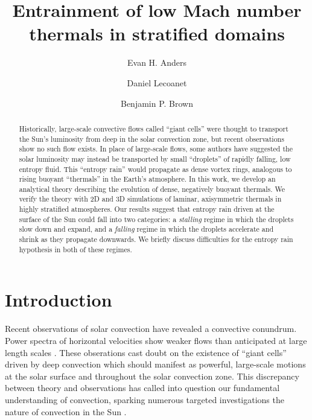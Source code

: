 \documentclass[twocolumn, amsmath, amsfonts, amssymb, trackchanges]{aastex62}
\begin{document}
\title{Entrainment of low Mach number thermals in stratified domains}


\author[0000-0002-3433-4733]{Evan H. Anders}
\author[0000-0002-7635-9728]{Daniel Lecoanet}
\author[0000-0001-8935-219X]{Benjamin P. Brown}


\begin{abstract}
Historically, large-scale convective flows called ``giant cells'' were thought to transport the Sun's luminosity from deep in the solar convection zone, but recent observations show no such flow exists.
In place of large-scale flows, some authors have suggested the solar luminosity may instead be transported by small ``droplets'' of rapidly falling, low entropy fluid.
This ``entropy rain'' would propagate as dense vortex rings, analogous to rising buoyant ``thermals'' in the Earth's atmosphere.
In this work, we develop an analytical theory describing the evolution of dense, negatively buoyant thermals.
We verify the theory with 2D and 3D simulations of laminar, axisymmetric thermals in highly stratified atmospheres.
Our results suggest that entropy rain driven at the surface of the Sun could fall into two categories: a \emph{stalling} regime in which the droplets slow down and expand, and a \emph{falling} regime in which the droplets accelerate and shrink as they propagate downwards.
We briefly discuss difficulties for the entropy rain hypothesis in both of these regimes.
\end{abstract}


\section{Introduction}
\label{sec:intro}
Recent observations of solar convection have revealed a convective conundrum.
Power spectra of horizontal velocities show weaker flows than anticipated at large length scales \citep{hanasoge&all2012, greer&all2015}.
These obserations cast doubt on the existence of ``giant cells'' driven by deep convection which should manifest as powerful, large-scale motions at the solar surface and throughout the solar convection zone. 
This discrepancy between theory and observations has called into question our fundamental understanding of convection, sparking numerous targeted investigations the nature of convection in the Sun  \citep{featherstone&hindman2016, omara&all2016, cossette&rast2016, kapyla&all2017, hotta2017}.
\end{document}
